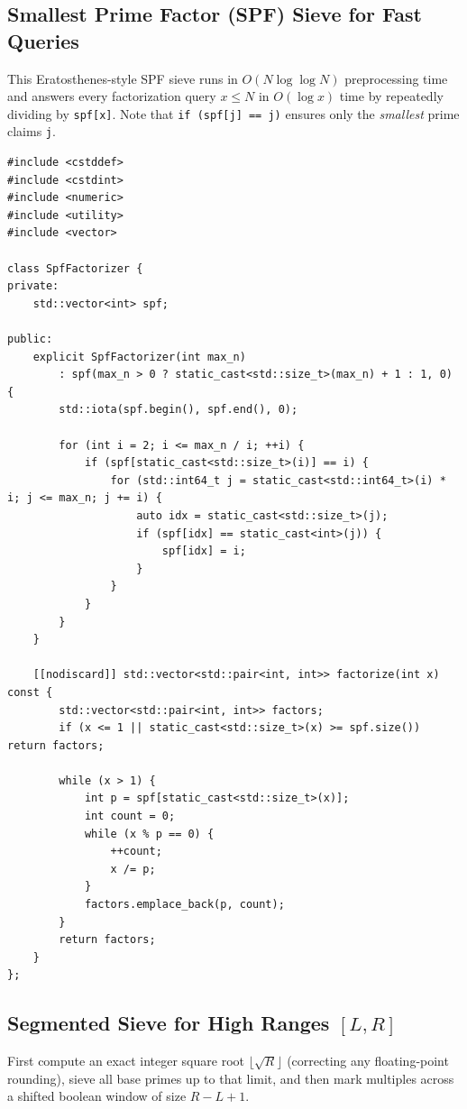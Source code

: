 \documentclass[11pt,a4paper]{article}
\theoremstyle{definition}
\begin{document}
\subsection{Smallest Prime Factor (SPF) Sieve for Fast Queries}

This Eratosthenes-style SPF sieve runs in $O(N \log\log N)$ preprocessing time and answers every factorization query $x \le N$ in $O(\log x)$ time by repeatedly dividing by \texttt{spf[x]}. Note that \texttt{if (spf[j] == j)} ensures only the \emph{smallest} prime claims \texttt{j}.

\begin{lstlisting}[caption={Smallest Prime Factor (SPF) Sieve for $O(\log x)$ Factorization Queries}]
#include <cstddef>
#include <cstdint>
#include <numeric>
#include <utility>
#include <vector>

class SpfFactorizer {
private:
    std::vector<int> spf;

public:
    explicit SpfFactorizer(int max_n)
        : spf(max_n > 0 ? static_cast<std::size_t>(max_n) + 1 : 1, 0) {
        std::iota(spf.begin(), spf.end(), 0);

        for (int i = 2; i <= max_n / i; ++i) {
            if (spf[static_cast<std::size_t>(i)] == i) {
                for (std::int64_t j = static_cast<std::int64_t>(i) * i; j <= max_n; j += i) {
                    auto idx = static_cast<std::size_t>(j);
                    if (spf[idx] == static_cast<int>(j)) {
                        spf[idx] = i;
                    }
                }
            }
        }
    }

    [[nodiscard]] std::vector<std::pair<int, int>> factorize(int x) const {
        std::vector<std::pair<int, int>> factors;
        if (x <= 1 || static_cast<std::size_t>(x) >= spf.size()) return factors;

        while (x > 1) {
            int p = spf[static_cast<std::size_t>(x)];
            int count = 0;
            while (x % p == 0) {
                ++count;
                x /= p;
            }
            factors.emplace_back(p, count);
        }
        return factors;
    }
};
\end{lstlisting}

\subsection{Segmented Sieve for High Ranges \texorpdfstring{$[L, R]$}{[L, R]}}

First compute an exact integer square root $\lfloor \sqrt{R} \rfloor$ (correcting any floating-point rounding), sieve all base primes up to that limit, and then mark multiples across a shifted boolean window of size $R - L + 1$.
\end{document}
